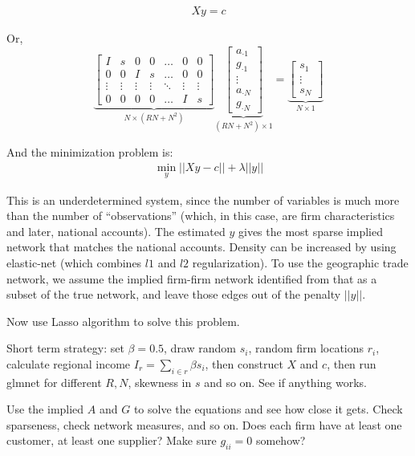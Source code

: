 \documentclass[11pt]{article}
\begin{document}
\begin{gather}
X y = c
\end{gather}

Or,
\[
\underbrace{\begin{bmatrix}
    I & s & 0 & 0 & \dots & 0  & 0 \\
    0 & 0 & I & s &  \dots & 0 & 0 \\
    \vdots & \vdots & \vdots & \vdots & \ddots & \vdots & \vdots \\
    0 & 0  & 0 & 0 & \dots  &  I & s
\end{bmatrix}}_{N \times (RN+N^2)}
\underbrace{\begin{bmatrix}
	a_{\cdot 1} \\
	g_{\cdot 1} \\
	\vdots \\
	a_{\cdot N} \\
	g_{\cdot N} 	
\end{bmatrix}}_{(RN+N^2) \times 1}
=
\underbrace{\begin{bmatrix}
	s_1 \\
	\vdots \\
	s_{N} 	
\end{bmatrix}}_{N\times 1}
\]

And the minimization problem is:
\begin{gather}
\min_y || X y - c|| + \lambda || y ||
\end{gather}

This is an underdetermined system, since the number of variables is much more than the number of ``observations'' (which, in this case, are firm characteristics and later, national accounts). The estimated $y$ gives the most sparse implied network that matches the national accounts. Density can be increased by using elastic-net (which combines $l1$ and $l2$ regularization).  To use the geographic trade network, we assume the implied firm-firm network identified from that as a subset of the true network, and leave those edges out of the penalty $||y||$.

Now use Lasso algorithm to solve this problem.

Short term strategy: set $\beta=0.5$, draw random $s_i$, random firm locations $r_i$, calculate regional income $I_r = \sum_{i \in r} \beta s_i$, then construct $X$ and $c$, then run glmnet for different $R,N$, skewness in $s$ and so on. See if anything works.

Use the implied $A$ and $G$ to solve the equations and see how close it gets. Check sparseness, check network measures, and so on. Does each firm have at least one customer, at least one supplier? Make sure $g_{ii}=0$ somehow?
\end{document}

